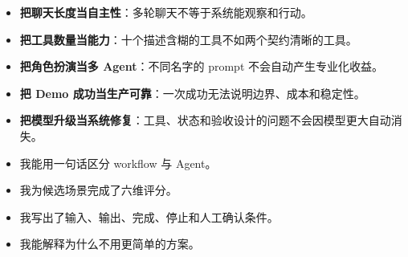 \begin{itemize}
  \item \textbf{把聊天长度当自主性}：多轮聊天不等于系统能观察和行动。
  \item \textbf{把工具数量当能力}：十个描述含糊的工具不如两个契约清晰的工具。
  \item \textbf{把角色扮演当多 Agent}：不同名字的 prompt 不会自动产生专业化收益。
  \item \textbf{把 Demo 成功当生产可靠}：一次成功无法说明边界、成本和稳定性。
  \item \textbf{把模型升级当系统修复}：工具、状态和验收设计的问题不会因模型更大自动消失。
\end{itemize}

\begin{checkpoint}
\begin{itemize}
  \item \checkbox 我能用一句话区分 workflow 与 Agent。
  \item \checkbox 我为候选场景完成了六维评分。
  \item \checkbox 我写出了输入、输出、完成、停止和人工确认条件。
  \item \checkbox 我能解释为什么不用更简单的方案。
\end{itemize}
\end{checkpoint}


